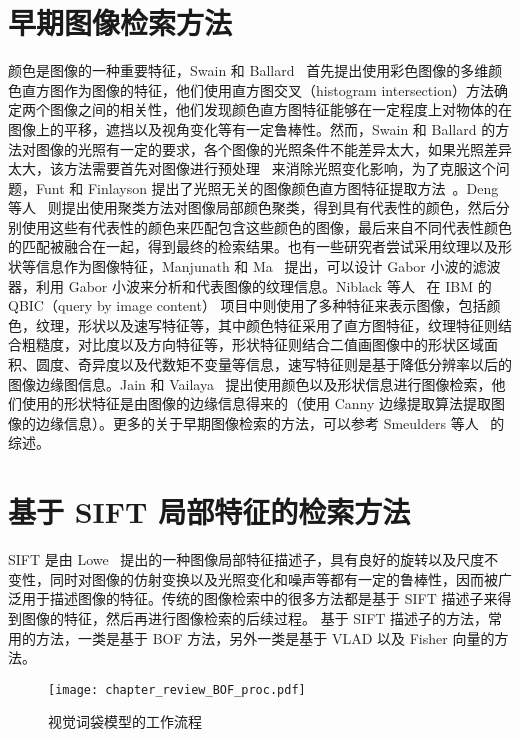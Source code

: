 \section{早期图像检索方法}\label{sec:early_work_review}

颜色是图像的一种重要特征，Swain 和 Ballard~\cite{Swain1991ColorI} 首先提出使用彩色图像的多维颜色直方图作为图像的特征，他们使用直方图交叉（histogram intersection）方法确定两个图像之间的相关性，他们发现颜色直方图特征能够在一定程度上对物体的在图像上的平移，遮挡以及视角变化等有一定鲁棒性。然而，Swain 和 Ballard 的方法对图像的光照有一定的要求，各个图像的光照条件不能差异太大，如果光照差异太大，该方法需要首先对图像进行预处理~\cite{Forsyth1990ANA} 来消除光照变化影响，为了克服这个问题，Funt 和 Finlayson 提出了光照无关的图像颜色直方图特征提取方法~\cite{Funt1995ColorCC}。Deng 等人~\cite{Deng2001AnEC} 则提出使用聚类方法对图像局部颜色聚类，得到具有代表性的颜色，然后分别使用这些有代表性的颜色来匹配包含这些颜色的图像，最后来自不同代表性颜色的匹配被融合在一起，得到最终的检索结果。也有一些研究者尝试采用纹理以及形状等信息作为图像特征，Manjunath 和 Ma~\cite{Manjunath1996TextureFF} 提出，可以设计 Gabor 小波的滤波器，利用 Gabor 小波来分析和代表图像的纹理信息。Niblack 等人~\cite{Niblack1993TheQP} 在 IBM 的 QBIC（query by image content） 项目中则使用了多种特征来表示图像，包括颜色，纹理，形状以及速写特征等，其中颜色特征采用了直方图特征，纹理特征则结合粗糙度，对比度以及方向特征等，形状特征则结合二值画图像中的形状区域面积、圆度、奇异度以及代数矩不变量等信息，速写特征则是基于降低分辨率以后的图像边缘图信息。Jain 和 Vailaya~\cite{Jain1996ImageRU} 提出使用颜色以及形状信息进行图像检索，他们使用的形状特征是由图像的边缘信息得来的（使用 Canny 边缘提取算法提取图像的边缘信息）。更多的关于早期图像检索的方法，可以参考 Smeulders 等人~\cite{Smeulders2000ContentBasedIR} 的综述。


\section{基于 SIFT 局部特征的检索方法}\label{sec:sift_based_method_review}

SIFT 是由 Lowe~\cite{Lowe2004DistinctiveIF} 提出的一种图像局部特征描述子，具有良好的旋转以及尺度不变性，同时对图像的仿射变换以及光照变化和噪声等都有一定的鲁棒性，因而被广泛用于描述图像的特征。传统的图像检索中的很多方法都是基于 SIFT 描述子来得到图像的特征，然后再进行图像检索的后续过程。 基于 SIFT 描述子的方法，常用的方法，一类是基于 BOF 方法，另外一类是基于 VLAD 以及 Fisher 向量的方法。

\begin{figure}[!t]
\centering
\texttt{[image: chapter\_review\_BOF\_proc.pdf]}
\caption{视觉词袋模型的工作流程}
\label{fig:bof_process}
\end{figure}


